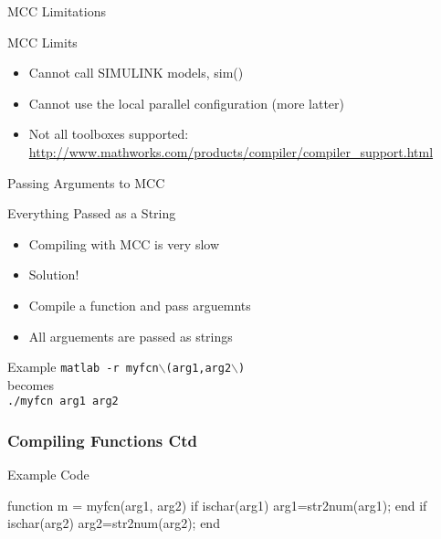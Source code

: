\documentclass[handout]{beamer}
\begin{document}
   
   \begin{frame}{MCC Limitations}
    \begin{block}{MCC Limits}
     \begin{itemize}
     \item Cannot call SIMULINK models, sim()
     \item Cannot use the local parallel configuration (more latter)
     \item Not all toolboxes supported: \\
      \url{http://www.mathworks.com/products/compiler/compiler\_support.html}
     \end{itemize}
    \end{block}
   \end{frame}

   \begin{frame}{Passing Arguments to MCC}
    \begin{block}{Everything Passed as a String}
     \begin{itemize}
      \item Compiling with MCC is very slow
      \item <2->Solution!
      \item <3->Compile a function and pass arguemnts
      \item <3->All arguements are passed as strings
     \end{itemize}
    \end{block}
    \begin{block}{Example}
     \texttt{matlab -r myfcn$\backslash$(arg1,arg2$\backslash$)}
     \\ becomes \\
     \texttt{./myfcn arg1 arg2}
    \end{block}
   \end{frame}

\begin{frame}[fragile]
    \frametitle{Compiling Functions Ctd}
    \begin{block}{Example Code}
    \begin{semiverbatim}
	function m = myfcn(arg1, arg2)
	if ischar(arg1)
	   arg1=str2num(arg1);
	end
	if ischar(arg2)
	   arg2=str2num(arg2);
	end
    \end{semiverbatim}
    \end{block}
\end{frame}
\end{document}
